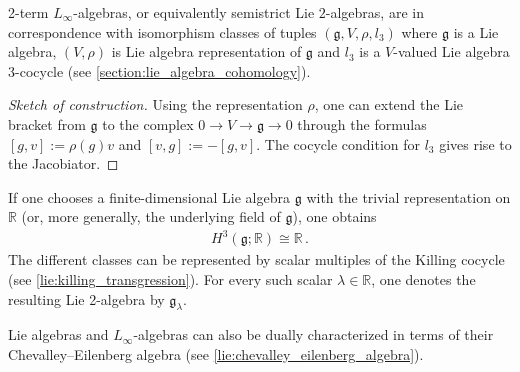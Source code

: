     \begin{property}
        2-term $L_\infty$-algebras, or equivalently semistrict Lie $2$-algebras, are in correspondence with isomorphism classes of tuples $(\mathfrak{g},V,\rho,l_3)$ where $\mathfrak{g}$ is a Lie algebra, $(V,\rho)$ is Lie algebra representation of $\mathfrak{g}$ and $l_3$ is a $V$-valued Lie algebra 3-cocycle (see \cref{section:lie_algebra_cohomology}).
        \begin{mdframed}[roundcorner=10pt, linecolor=blue, linewidth=1pt]
            \begin{proof}[Sketch of construction]
                Using the representation $\rho$, one can extend the Lie bracket from $\mathfrak{g}$ to the complex $0\rightarrow V\rightarrow\mathfrak{g}\rightarrow0$ through the formulas $[g,v]:=\rho(g)v$ and $[v,g] := -[g,v]$. The cocycle condition for $l_3$ gives rise to the Jacobiator.
            \end{proof}
        \end{mdframed}
    \end{property}
    \begin{example}\label{hda:gk_lie_2_algebra}
        If one chooses a finite-dimensional Lie algebra $\mathfrak{g}$ with the trivial representation on $\mathbb{R}$ (or, more generally, the underlying field of $\mathfrak{g}$), one obtains
        \begin{gather}
            H^3(\mathfrak{g};\mathbb{R})\cong\mathbb{R}\,.
        \end{gather}
        The different classes can be represented by scalar multiples of the Killing cocycle (see \cref{lie:killing_transgression}). For every such scalar $\lambda\in\mathbb{R}$, one denotes the resulting Lie 2-algebra by $\mathfrak{g}_\lambda$.
    \end{example}

    Lie algebras and $L_\infty$-algebras can also be dually characterized in terms of their Chevalley--Eilenberg algebra (see \cref{lie:chevalley_eilenberg_algebra}).

